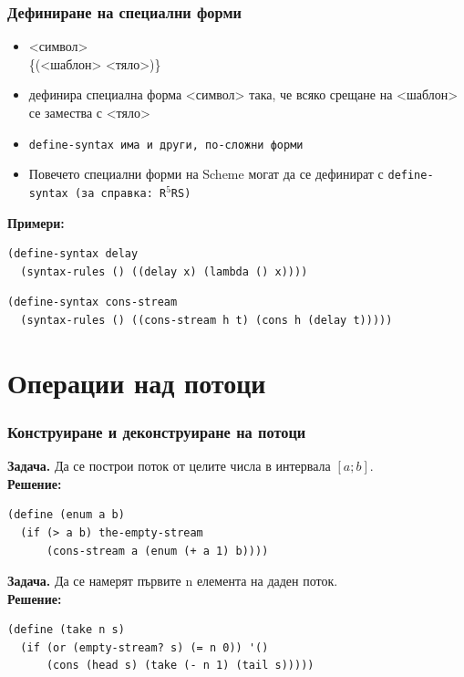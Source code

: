 \documentclass[alsotrans,beameroptions={aspectratio=169}]{beamerswitch}
\begin{document}
\begin{frame}[fragile]
  \frametitle{Дефиниране на специални форми}

  \begin{itemize}[<+->]
  \item {} <символ>\\
    \hspace{2.5em} \{\tta(<шаблон> <тяло>\tta)\}\tta{))}
  \item дефинира специална форма <символ> така, че всяко срещане на <шаблон> се замества с <тяло>
  \item \tt{define-syntax} има и други, по-сложни форми
  \item Повечето специални форми на Scheme могат да се дефинират с \tt{define-syntax} (за справка: R$^5$RS)
  \end{itemize}
  \onslide<+->
  \textbf{Примери:}
  \onslide<+->
\begin{lstlisting}
(define-syntax delay
  (syntax-rules () ((delay x) (lambda () x))))
\end{lstlisting}
  \onslide<+->
\begin{lstlisting}
(define-syntax cons-stream
  (syntax-rules () ((cons-stream h t) (cons h (delay t)))))
\end{lstlisting}
\end{frame}

\section{Операции над потоци}

\begin{frame}[fragile]
  \frametitle{Конструиране и деконструиране на потоци}

  \textbf{Задача.} Да се построи поток от целите числа в интервала $[a; b]$.\\
  \pause
  \textbf{Решение:}
\begin{lstlisting}
(define (enum a b)
  (if (> a b) the-empty-stream
      (cons-stream a (enum (+ a 1) b))))
\end{lstlisting}
  \pause
  \textbf{Задача.} Да се намерят първите n елемента на даден поток.\\
  \pause
  \textbf{Решение:}
\begin{lstlisting}
(define (take n s)
  (if (or (empty-stream? s) (= n 0)) '()
      (cons (head s) (take (- n 1) (tail s)))))
\end{lstlisting}
\end{frame}
\end{document}
